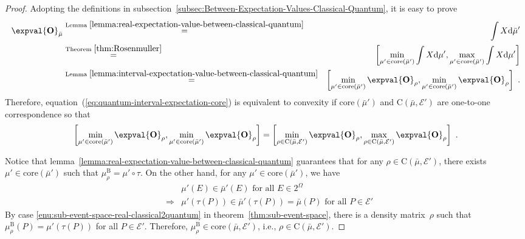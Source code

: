 \documentclass[12pt]{iopart}
\theoremstyle{plain}
\theoremstyle{definition}
\theoremstyle{remark}
\newcommand{\events}{\ensuremath{\mathcal{E}}}
\newcommand{\coreBorn}{\ensuremath{\mathrm{C}}}
\begin{document}
\begin{proof}Adopting the definitions in subsection~\ref{subsec:Between-Expectation-Values-Classical-Quantum},
it is easy to prove
\begin{eqnarray*}
\expval{\mathbf{O}}_{\bar{\mu}} & \stackrel{\textrm{Lemma }\ref{lemma:real-expectation-value-between-classical-quantum}}{=} & \int X\rmd\bar{\mu}'\\
 & \stackrel{\textrm{Theorem }\ref{thm:Rosenmuller}}{=} & \left[\min_{\mu'\in\mathrm{core}\left(\bar{\mu}'\right)}\int X\rmd\mu',\max_{\mu'\in\mathrm{core}\left(\bar{\mu}'\right)}\int X\rmd\mu'\right]\\
 & \stackrel{\textrm{Lemma }\ref{lemma:interval-expectation-value-between-classical-quantum}}{=} & \left[\min_{\mu'\in\mathrm{core}\left(\bar{\mu}'\right)}\expval{\mathbf{O}}_{\rho},\min_{\mu'\in\mathrm{core}\left(\bar{\mu}'\right)}\expval{\mathbf{O}}_{\rho}\right]\textrm{ .}
\end{eqnarray*}
Therefore, equation~(\ref{eq:quantum-interval-expectation-core})
is equivalent to convexity if $\mathrm{core}\left(\bar{\mu}'\right)$
and $\coreBorn\left(\bar{\mu},\events'\right)$ are one-to-one correspondence
so that
\begin{equation}
\left[\min_{\mu'\in\mathrm{core}\left(\bar{\mu}'\right)}\expval{\mathbf{O}}_{\rho},\min_{\mu'\in\mathrm{core}\left(\bar{\mu}'\right)}\expval{\mathbf{O}}_{\rho}\right]=\left[\min_{\rho\in\coreBorn\left(\bar{\mu},\events'\right)}\expval{\mathbf{O}}_{\rho},\max_{\rho\in\coreBorn\left(\bar{\mu},\events'\right)}\expval{\mathbf{O}}_{\rho}\right]\textrm{ .}
\end{equation}

Notice that lemma~\ref{lemma:real-expectation-value-between-classical-quantum}
guarantees that for any $\rho\in\coreBorn\left(\bar{\mu},\events'\right)$,
there exists $\mu'\in\mathrm{core}\left(\bar{\mu}'\right)$ such that
$\mu_{\rho}^{\mathrm{B}}=\mu'\circ\tau$. On the other hand, for any
$\mu'\in\mathrm{core}\left(\bar{\mu}'\right)$, we have
\begin{eqnarray}
 &  & \mu'\left(E\right)\in\bar{\mu}'\left(E\right)\textrm{ for all }E\in2^{\Omega}\\
 & \Rightarrow & \mu'\left(\tau\left(P\right)\right)\in\bar{\mu}'\left(\tau\left(P\right)\right)=\bar{\mu}\left(P\right)\textrm{ for all }P\in\events'
\end{eqnarray}
By case \ref{enu:sub-event-space-real-classical2quantum} in theorem~\ref{thm:sub-event-space},
there is a density matrix~$\rho$ such that $\mu_{\rho}^{\mathrm{B}}\left(P\right)=\mu'\left(\tau\left(P\right)\right)$
for all $P\in\events'$. Therefore, $\mu_{\rho}^{\mathrm{B}}\in\mathrm{core}\left(\bar{\mu},\events'\right)$,
i.e., $\rho\in\coreBorn\left(\bar{\mu},\events'\right)$.\end{proof}
\end{document}
